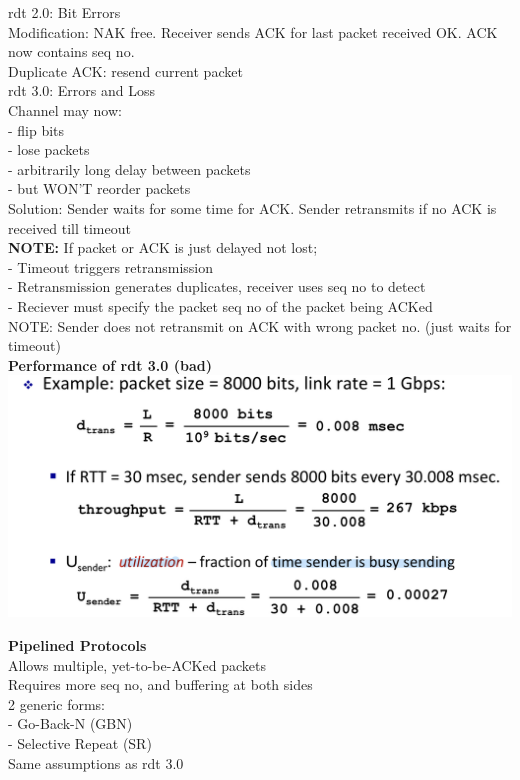 \documentclass[10pt, a4paper]{article}
\newcommand{\highlight}[1]{{\color{red}\textbf{#1}}}
\newcommand{\blue}[1]{{\color{MidnightBlue}#1}}
\newcommand{\red}[1]{{\color{red}#1}}
\newcommand{\green}[1]{{\color{ForestGreen}#1}}
\begin{document}
\begin{multicols*}{3}
		rdt 2.0: \red{Bit Errors}\\
		\green{Modification}: NAK free. Receiver sends ACK for \blue{last packet received OK}. ACK now contains seq no.\\
		Duplicate ACK: resend \blue{current packet}\\

		rdt 3.0: \red{Errors and Loss}\\
		Channel may now:\\
		- flip bits\\
		- lose packets\\
		- arbitrarily long delay between packets\\
		- but \red{WON'T} reorder packets\\
		\green{Solution:} Sender waits for some time for ACK. Sender \blue{retransmits} if no ACK is received till \blue{timeout}\\
		\highlight{NOTE:} If packet or ACK is just delayed not lost;\\
		- Timeout triggers retransmission\\
		- Retransmission generates \blue{duplicates}, receiver uses seq no to detect\\
		- Reciever must specify the packet seq no of the packet being ACKed\\
		\red{NOTE:} Sender does not retransmit on ACK with \red{wrong packet no.} (just waits for timeout)\\

		\textbf{Performance of rdt 3.0 (bad)}\\
		\includegraphics[scale=.145]{./assets/rdtPerformance}

		\textbf{Pipelined Protocols}\\
		Allows \blue{multiple, yet-to-be-ACKed} packets\\
		Requires more seq no, and buffering at both sides\\
		2 generic forms:\\
		- Go-Back-N (GBN)\\
		- Selective Repeat (SR)\\
		Same assumptions as rdt 3.0\\


\end{multicols*}
\end{document}
